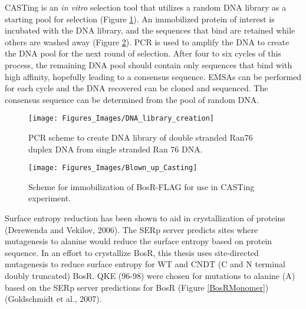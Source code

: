 \documentclass[12pt,twoside]{reedthesis}
\begin{document}
CASTing is an \textit{in vitro} selection tool that utilizes a random DNA library as a starting pool for selection (Figure \ref{DNALibrary}). An immobilized protein of interest is incubated with the DNA library, and the sequences that bind are retained while others are washed away (Figure \ref{CASTingScheme}). PCR is used to amplify the DNA to create the DNA pool for the next round of selection. After four to six cycles of this process, the remaining DNA pool should contain only sequences that bind with high affinity, hopefully leading to a consensus sequence. EMSAs can be performed for each cycle and the DNA recovered can be cloned and sequenced. The consensus sequence can be determined from the pool of random DNA.
		 	 	\begin{figure}[h]
		 	 		
		 	 		\centering
		 	 		\texttt{[image: Figures\_Images/DNA\_library\_creation]}
		 	 		\caption[DNA Library Creation]{PCR scheme to create DNA library of double stranded Ran76 duplex DNA from single stranded Ran 76 DNA.}
		 	 		\label{DNALibrary}
		 	 	\end{figure}
		 	 	
		 	\begin{figure}[h]
		 		
		 		\centering
		 		\texttt{[image: Figures\_Images/Blown\_up\_Casting]}
		 		\caption[Binding Reaction and Immunoprecipitation Scheme ]{Scheme for immobilization of BosR-FLAG for use in CASTing experiment.}
		 		\label{CASTingScheme}
		 	\end{figure}
		 	
		 Surface entropy reduction has been shown to aid in crystallization of proteins (Derewenda and Vekilov, 2006). The SERp server predicts sites where mutagenesis to alanine would reduce the surface entropy based on protein sequence. In an effort to crystallize BosR, this thesis uses site-directed mutagenesis to reduce surface entropy for WT and CNDT (C and N terminal doubly truncated) BosR. QKE (96-98) were chosen for mutations to alanine (A) based on the SERp server predictions for BosR (Figure \ref{BosRMonomer}) (Goldschmidt et al., 2007).  
		 	
\end{document}
